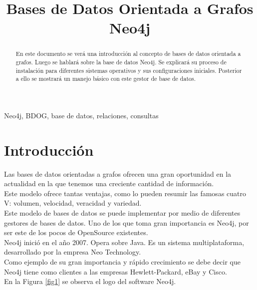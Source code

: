 \documentclass[conference]{IEEEtran}
\begin{document}
\title{Bases de Datos Orientada a Grafos\\
Neo4j\\
}

\author{
\and
{}
}

\maketitle

\begin{abstract}
En este documento se verá una introducción al concepto de bases de datos orientada a grafos. Luego se hablará sobre la base de datos Neo4j. Se explicará su proceso de instalación para diferentes sistemas operativos y sus configuraciones iniciales. Posterior a ello se mostrará un manejo básico con este gestor de base de datos.
\end{abstract}

\begin{IEEEkeywords}
Neo4j, BDOG, base de datos, relaciones, consultas
\end{IEEEkeywords}

\section{Introducción}

Las bases de datos orientadas a grafos ofrecen una gran oportunidad en la actualidad en la que tenemos una creciente cantidad de información. \\
Este modelo ofrece tantas ventajas, como lo pueden resumir las famosas cuatro V: volumen, velocidad, veracidad y variedad. \\
Este modelo de bases de datos se puede implementar por medio de diferentes gestores de bases de datos.  Uno de los que toma gran importancia es Neo4j, por ser este de los pocos de OpenSource existentes.\\
Neo4j inició en el año 2007. Opera sobre Java. Es un sistema multiplataforma, desarrollado por la empresa Neo Technology. \\
Como ejemplo de su gran importancia y rápido crecimiento se debe decir que Neo4j tiene como clientes a las empresas Hewlett-Packard, eBay y Cisco.\\
En la Figura \ref{fig1} se observa el logo del software Neo4j.
\end{document}
